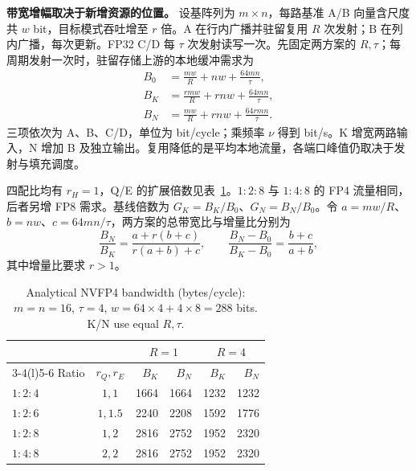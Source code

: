 \textbf{带宽增幅取决于新增资源的位置。} 设基阵列为 $m\times n$，每路基准 A/B 向量含尺度共 $w$ bit，目标模式吞吐增至 $r$ 倍。A 在行内广播并驻留复用 $R$ 次发射；B 在列内广播，每次更新。FP32 C/D 每 $\tau$ 次发射读写一次。先固定两方案的 $R,\tau$；每周期发射一次时，驻留存储上游的本地缓冲需求为
\begin{equation}
\begin{aligned}
B_0 &= \frac{mw}{R}+nw+\frac{64mn}{\tau},\\
B_K &= \frac{rmw}{R}+rnw+\frac{64mn}{\tau},\\
B_N &= \frac{mw}{R}+rnw+\frac{64rmn}{\tau}.
\end{aligned}
\label{eq:kn_bandwidth}
\end{equation}
三项依次为 A、B、C/D，单位为 bit/cycle；乘频率 $\nu$ 得到 bit/s。K 增宽两路输入，N 增加 B 及独立输出。复用降低的是平均本地流量，各端口峰值仍取决于发射与填充调度。

四配比均有 $r_H=1$，Q/E 的扩展倍数见表~\ref{tab:kn_bandwidth}。$1:2:8$ 与 $1:4:8$ 的 FP4 流量相同，后者另增 FP8 需求。基线倍数为 $G_K=B_K/B_0$、$G_N=B_N/B_0$。令 $a=mw/R$、$b=nw$、$c=64mn/\tau$，两方案的总带宽比与增量比分别为
\begin{equation}
\frac{B_N}{B_K}=\frac{a+r(b+c)}{r(a+b)+c},\qquad
\frac{B_N-B_0}{B_K-B_0}=\frac{b+c}{a+b},
\label{eq:kn_bandwidth_growth}
\end{equation}
其中增量比要求 $r>1$。

\begin{table}[t]
\centering
\caption{Analytical NVFP4 bandwidth (bytes/cycle): $m=n=16$, $\tau=4$, $w=64\times4+4\times8=288$ bits. K/N use equal $R,\tau$.}
\label{tab:kn_bandwidth}
\begingroup\footnotesize\setlength{\tabcolsep}{2pt}
\begin{tabular*}{\columnwidth}{@{\extracolsep{\fill}}lcrrrr@{}}\toprule
 & & \multicolumn{2}{c}{$R=1$} & \multicolumn{2}{c}{$R=4$} \\
\cmidrule(lr){3-4}\cmidrule(l){5-6}
Ratio & $r_Q,r_E$ & $B_K$ & $B_N$ & $B_K$ & $B_N$ \\\midrule
$1:2:4$ & $1,1$ & 1664 & 1664 & 1232 & 1232 \\
$1:2:6$ & $1,1.5$ & 2240 & 2208 & 1592 & 1776 \\
$1:2:8$ & $1,2$ & 2816 & 2752 & 1952 & 2320 \\
$1:4:8$ & $2,2$ & 2816 & 2752 & 1952 & 2320 \\
\bottomrule\end{tabular*}\endgroup
\end{table}

